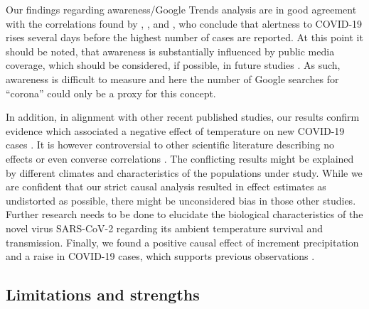 \documentclass[]{elsarticle} %
\begin{document}
Our findings regarding awareness/Google Trends analysis are in good agreement with the correlations found by \citet{effenberger_association_2020}, \citet{higgins_correlations_2020}, and \citet{yuan_trends_2020}, who conclude that alertness to COVID-19 rises several days before the highest number of cases are reported. At this point it should be noted, that awareness is substantially influenced by public media coverage, which should be considered, if possible, in future studies \citep{higgins_correlations_2020}. As such, awareness is difficult to measure and here the number of Google searches for ``corona'' could only be a proxy for this concept.

In addition, in alignment with other recent published studies, our results confirm evidence which associated a negative effect of temperature on new COVID-19 cases \citep{bannister-tyrrell_preliminary_2020, demongeot_temperature_2020, liu_impact_2020, qi_covid-19_2020, shi_impact_2020, sobral_association_2020, tosepu_correlation_2020, Wang2020temperature, wu_effects_2020}. It is however controversial to other scientific literature describing no effects \citep{briz-redon_spatio-temporal_2020, iqbal_nexus_2020, jahangiri_sensitivity_2020, juni_impact_2020, yao_no_2020} or even converse correlations \citep{auler_evidence_2020, xie_association_2020}. The conflicting results might be explained by different climates and characteristics of the populations under study. While we are confident that our strict causal analysis resulted in effect estimates as undistorted as possible, there might be unconsidered bias in those other studies. Further research needs to be done to elucidate the biological characteristics of the novel virus SARS-CoV-2 regarding its ambient temperature survival and transmission. Finally, we found a positive causal effect of increment precipitation and a raise in COVID-19 cases, which supports previous observations \citep{sobral_association_2020}.

\hypertarget{limitations-and-strengths}{%
\subsection{Limitations and strengths}\label{limitations-and-strengths}}
\end{document}
